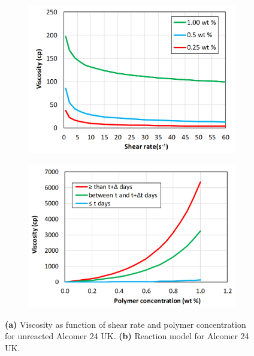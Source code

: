 \documentclass[nanomaterials,article,submit,moreauthors,pdftex]{Definitions/mdpi}
\begin{document}
\begin{figure}[h!]
    \centering
    \begin{subfigure}[b]{.49\textwidth}
        \includegraphics[width=\textwidth]{fig/viscAlcomer.png}
        \caption{}
        \label{cht:viscAlco}
    \end{subfigure}
    \begin{subfigure}[b]{.49\textwidth}
        \includegraphics[width=\textwidth]{fig/viscPolcModel.png}
        \caption{}
        \label{cht:viscPolcModel}
    \end{subfigure}
    \caption{\textbf{(a)} Viscosity as function of shear rate and polymer concentration for unreacted Alcomer 24 UK. \textbf{(b)} Reaction model for Alcomer 24 UK.}
\end{figure}
\end{document}
